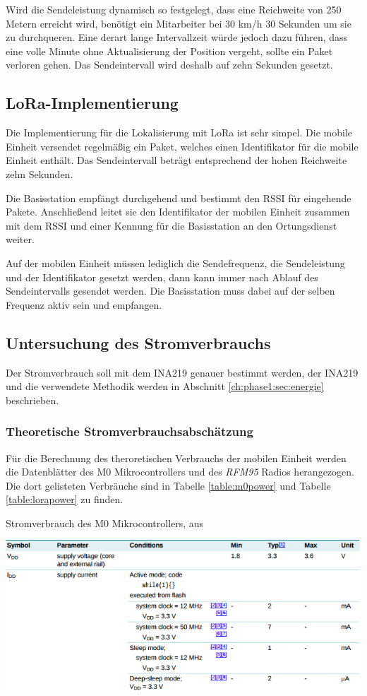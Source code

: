 Wird die Sendeleistung dynamisch so festgelegt, dass eine Reichweite von 250 Metern erreicht wird, benötigt ein Mitarbeiter bei 30 km/h 30 Sekunden um sie zu durchqueren.
Eine derart lange Intervallzeit würde jedoch dazu führen, dass eine volle Minute ohne Aktualisierung der Position vergeht, sollte ein Paket verloren gehen.
Das Sendeintervall wird deshalb auf zehn Sekunden gesetzt.

\subsection{LoRa-Implementierung}
Die Implementierung für die Lokalisierung mit LoRa ist sehr simpel.
Die mobile Einheit versendet regelmäßig ein Paket, welches einen Identifikator für die mobile Einheit enthält.
Das Sendeintervall beträgt entsprechend der hohen Reichweite zehn Sekunden.

Die Basisstation empfängt durchgehend und bestimmt den RSSI für eingehende Pakete.
Anschließend leitet sie den Identifikator der mobilen Einheit zusammen mit dem RSSI und einer Kennung für die Basisstation an den Ortungsdienst weiter.

Auf der mobilen Einheit müssen lediglich die Sendefrequenz, die Sendeleistung und der Identifikator gesetzt werden, dann kann immer nach Ablauf des Sendeintervalls gesendet werden.
Die Basisstation muss dabei auf der selben Frequenz aktiv sein und empfangen.


\subsection{Untersuchung des Stromverbrauchs}
Der Stromverbrauch soll mit dem INA219 genauer bestimmt werden, der INA219 und die verwendete Methodik werden in Abschnitt \ref{ch:phase1:sec:energie} beschrieben.

\subsubsection{Theoretische Stromverbrauchsabschätzung}
Für die Berechnung des theroretischen Verbrauchs der mobilen Einheit werden die Datenblätter des M0 Mikrocontrollers und des \emph{RFM95} Radios herangezogen. 
Die dort gelisteten Verbräuche sind in Tabelle \ref{table:m0power} und Tabelle \ref{table:lorapower} zu finden.

\begin{table}[h]
  \centering
  \caption{Stromverbrauch des M0 Mikrocontrollers, aus \cite{nxp2016m0}}
	\includegraphics[width=\textwidth]{images/m0power.png}
  \label{table:m0power}
\end{table}

